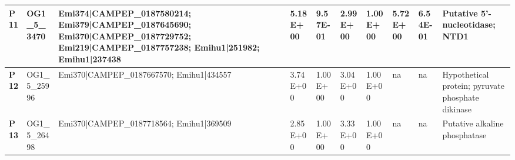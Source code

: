 \begin{landscape}
\begin{center}
\begin{footnotesize}
\begin{longtable}{|p{0.5cm}|p{1.5cm}|p{4cm}|l|l|l|l|l|l|l|}
\textbf{P11} & OG1\_5\_3470  & Emi374|CAMPEP\_0187580214; Emi379|CAMPEP\_0187645690; Emi370|CAMPEP\_0187729752; Emi219|CAMPEP\_0187757238; Emihu1|251982; Emihu1|237438                                                                                                                                                                                                                                                                                                                                                                                                                                                                                                 & 5.18E+00  & 9.57E-01 & 2.99E+00  & 1.00E+00 & 5.72E+00  & 6.54E-01 & Putative 5'-nucleotidase; NTD1                                               \\ \hline
\textbf{P12} & OG1\_5\_25996 & Emi370|CAMPEP\_0187667570; Emihu1|434557                                                                                                                                                                                                                                                                                                                                                                                                                                                                                                                                                                                                 & 3.74E+00  & 1.00E+00 & 3.04E+00  & 1.00E+00 & na        & na       & Hypothetical protein; pyruvate phosphate dikinase                            \\ \hline
\textbf{P13} & OG1\_5\_26498 & Emi370|CAMPEP\_0187718564; Emihu1|369509                                                                                                                                                                                                                                                                                                                                                                                                                                                                                                                                                                                                 & 2.85E+00  & 1.00E+00 & 3.33E+00  & 1.00E+00 & na        & na       & Putative alkaline phosphatase                                                \\ \hline

\end{longtable}
\end{footnotesize}
\end{center}
\end{landscape}
